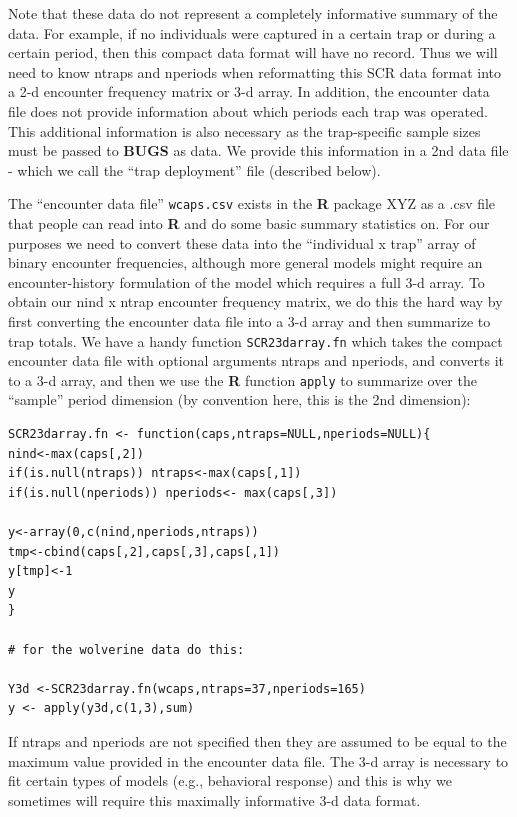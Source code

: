 Note that these data do not represent a completely informative summary
of the data. For example, if no individuals were captured in a certain
trap or during a certain period, then this compact data format will
have no record. Thus we will need to know ntraps and nperiods when
reformatting this SCR data format into a 2-d encounter frequency
matrix or 3-d array. In addition, the encounter data file does not
provide information about which periods each trap was operated. This
additional information is also necessary as the trap-specific sample
sizes must be passed to {\bf BUGS} as data. We provide this information in a
2nd data file - which we call the ``trap deployment'' file (described
below).

The ``encounter data file'' \mbox{\tt wcaps.csv} exists in the {\bf R}
package XYZ as 
a .csv file that people can read into {\bf R} and do some basic summary
statistics on. For our purposes we need to convert these data into the
``individual x trap'' array of binary encounter frequencies, although
more general models might require an encounter-history formulation of
the model which requires a full 3-d array.  To obtain our nind x ntrap
encounter frequency matrix, we do this the hard way by first
converting the encounter data file into a 3-d array and then summarize
to trap totals. We have a handy function \mbox{\tt SCR23darray.fn} which
takes the compact encounter data file with optional arguments ntraps
and nperiods, and converts it to a 3-d array, and then we use the {\bf
  R}
function \mbox{\tt apply} to summarize over the ``sample'' period dimension
(by convention here, this is the 2nd dimension):

\begin{verbatim}
SCR23darray.fn <- function(caps,ntraps=NULL,nperiods=NULL){
nind<-max(caps[,2])
if(is.null(ntraps)) ntraps<-max(caps[,1])
if(is.null(nperiods)) nperiods<- max(caps[,3])

y<-array(0,c(nind,nperiods,ntraps))
tmp<-cbind(caps[,2],caps[,3],caps[,1])
y[tmp]<-1
y
}

# for the wolverine data do this:

Y3d <-SCR23darray.fn(wcaps,ntraps=37,nperiods=165)
y <- apply(y3d,c(1,3),sum)
\end{verbatim}

If ntraps and nperiods are not specified then they are assumed to be equal to the maximum value provided in the encounter data file.  The 3-d array is necessary to fit certain types of models (e.g., behavioral response) and this is why we sometimes will require this maximally informative 3-d data format.

